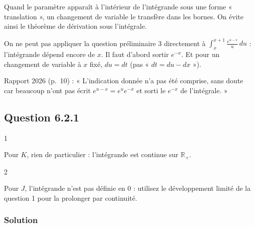 \documentclass[11pt,a4paper]{article}
\newcommand{\equationajustee}[1]{%
  \sbox{\boiteequation}{$\displaystyle #1$}%
  \ifdim\wd\boiteequation>\linewidth
    \[\resizebox{\linewidth}{!}{\usebox{\boiteequation}}\]%
  \else
    \[#1\]%
  \fi}
\begin{document}
\equationajustee{\begin{aligned}
G'(x)&=-e^{-x}\Phi(x)+e^{-x}\Phi'(x)\\
&=-G(x)+\frac{e}{x+1}-\frac1x.
\end{aligned}}

\begin{methode}

Quand le paramètre apparaît à l'intérieur de l'intégrande sous une forme « translation », un changement de variable le transfère dans les bornes. On évite ainsi le théorème de dérivation sous l'intégrale.

\end{methode}

\begin{piege}

On ne peut pas appliquer la question préliminaire 3 directement à \(\int_x^{x+1}\frac{e^{u-x}}{u}\,du\) : l'intégrande dépend encore de \(x\). Il faut d'abord sortir \(e^{-x}\). Et pour un changement de variable à \(x\) fixé, \(du=dt\) (pas « \(dt=du-dx\) »).

\end{piege}

\begin{jury}

Rapport 2026 (p.~10) : « L'indication donnée n'a pas été comprise, sans doute car beaucoup n'ont pas écrit \(e^{u-x}=e^ue^{-x}\) et sorti le \(e^{-x}\) de l'intégrale. »

\end{jury}

\hypertarget{question-6.2.1}{%
\subsection{Question 6.2.1}\label{question-6.2.1}}

\begin{indication}{1}

Pour \(K\), rien de particulier : l'intégrande est continue sur \(\mathbb R_+\).

\end{indication}

\begin{indication}{2}

Pour \(J\), l'intégrande n'est pas définie en \(0\) : utilisez le développement limité de la question 1 pour la prolonger par continuité.

\end{indication}

\hypertarget{solution-27}{%
\subsubsection{Solution}\label{solution-27}}
\end{document}
